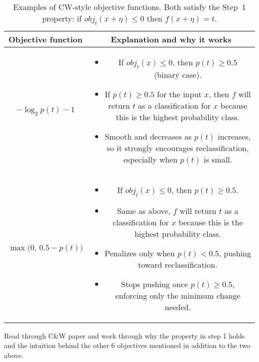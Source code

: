 \documentclass[11pt]{article}
\begin{document}
\begin{table}[h!]
\centering
\renewcommand{\arraystretch}{1.4}
\begin{tabular}{|c|c|}
\hline
\textbf{Objective function} & \textbf{Explanation and why it works} \\
\hline
$\displaystyle -\log_2 p(t) - 1$ &
\begin{minipage}[t]{0.65\textwidth}
\begin{itemize}[leftmargin=*]
    \item If $obj_t(x) \le 0$, then $p(t) \ge 0.5$ (binary case).
    \item If $p(t) \ge 0.5$ for the input $x$, then $f$ will return $t$ as a classification for $x$ because this is the highest probability class.
    \item Smooth and decreases as $p(t)$ increases, so it strongly encourages reclassification, especially when $p(t)$ is small.
\end{itemize}
\end{minipage} \\
\hline
$\displaystyle \max\!\bigl(0,\,0.5 - p(t)\bigr)$ &
\begin{minipage}[t]{0.65\textwidth}
\begin{itemize}[leftmargin=*]
    \item If $obj_t(x) \le 0$, then $p(t) \ge 0.5$.
    \item Same as above, $f$ will return $t$ as a classification for $x$ because this is the highest probability class.
    \item Penalizes only when $p(t) < 0.5$, pushing toward reclassification.
    \item Stops pushing once $p(t) \ge 0.5$, enforcing only the minimum change needed.
\end{itemize}
\end{minipage} \\
\hline
\end{tabular}
\caption{Examples of CW-style objective functions. Both satisfy the Step~1 property:
if $obj_t(x + \eta) \le 0$ then $f(x + \eta)=t$.} 
\end{table}

\begin{exercise}
	Read through C\&W paper \cite{carlini2017towards} and work through why the property in step 1 holds and the intuition behind the other 6 objectives mentioned in addition to the two above.
\end{exercise}
\end{document}
